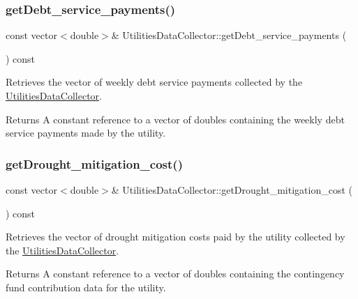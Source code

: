 \subsubsection{\texorpdfstring{get\+Debt\+\_\+service\+\_\+payments()}{getDebt\_service\_payments()}}
{\footnotesize\ttfamily const vector$<$double$>$\& Utilities\+Data\+Collector\+::get\+Debt\+\_\+service\+\_\+payments (\begin{DoxyParamCaption}{ }\end{DoxyParamCaption}) const}



Retrieves the vector of weekly debt service payments collected by the {\ttfamily \mbox{\hyperlink{classUtilitiesDataCollector}{Utilities\+Data\+Collector}}}. 

\begin{DoxyReturn}{Returns}
A constant reference to a vector of doubles containing the weekly debt service payments made by the utility. 
\end{DoxyReturn}
\mbox{\label{classUtilitiesDataCollector_a911a0651222ac1d8185eef001fdb2ea8}} 
\subsubsection{\texorpdfstring{get\+Drought\+\_\+mitigation\+\_\+cost()}{getDrought\_mitigation\_cost()}}
{\footnotesize\ttfamily const vector$<$double$>$\& Utilities\+Data\+Collector\+::get\+Drought\+\_\+mitigation\+\_\+cost (\begin{DoxyParamCaption}{ }\end{DoxyParamCaption}) const}



Retrieves the vector of drought mitigation costs paid by the utility collected by the {\ttfamily \mbox{\hyperlink{classUtilitiesDataCollector}{Utilities\+Data\+Collector}}}. 

\begin{DoxyReturn}{Returns}
A constant reference to a vector of doubles containing the contingency fund contribution data for the utility. 
\end{DoxyReturn}
\mbox{\label{classUtilitiesDataCollector_adb6e9b219255d8bb1fb323d6e5582e5c}} 
